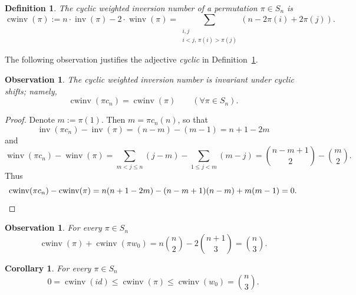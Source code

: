 \documentclass[11pt]{amsart}
\newtheorem{corollary}[theorem]{Corollary}
\newtheorem{observation}[theorem]{Observation}
\newtheorem{defn}[theorem]{Definition}
\numberwithin{equation}{section}
\newcommand{\inv}{{\operatorname{inv}}}
\newcommand{\winv}{{\operatorname{winv}}}
\newcommand{\cwinv}{{\operatorname{cwinv}}}
\begin{document}
\begin{defn}\label{def:cyclic winv}
    The {\em cyclic weighted inversion number} of a permutation $\pi\in S_n$ is
    \[
        \cwinv(\pi)
        := n\cdot \inv(\pi)-2\cdot \winv(\pi)
        = \sum_{\substack{i,j \\ i<j,\, \pi(i)>\pi(j)}} (n-2\pi(i) + 2\pi(j)).
    \]
\end{defn}

The following observation justifies the adjective {\em cyclic} in Definition~\ref{def:cyclic winv}. 

\begin{observation}\label{obs:u3}
The cyclic weighted inversion number is invariant under cyclic shifts; namely, 
\[
    \cwinv(\pi c_n) = \cwinv(\pi) 
    \qquad (\forall \pi\in S_n).
\]
\end{observation}

\begin{proof}
    Denote $m:=\pi(1)$. Then $m = \pi c_n(n)$, so that
    \[
        \inv(\pi c_n)-\inv(\pi)
        = (n-m)-(m-1) = n+1-2m
    \]
    and
    \[
        \winv(\pi c_n)-\winv(\pi)
        = \sum_{m < j \le n} (j-m) -\sum_{1 \le j < m} (m-j)
        = \binom{n-m+1}{2} - \binom{m}{2}.
    \]
    Thus
    \[
        \cwinv(\pi c_n)-\cwinv(\pi)
        = n(n+1-2m)-(n-m+1)(n-m)+m(m-1)
        = 0. \qedhere
    \]
\end{proof}

\begin{observation}\label{obs:u4}
    For every $\pi\in S_n$
    \[
    \cwinv(\pi)+\cwinv(\pi w_0)= n\binom{n}{2}-2\binom{n+1}{3}=\binom{n}{3}.
    \]
\end{observation}

\begin{corollary}\label{obs:u5}
    For every $\pi\in S_n$
    \[
    0=\cwinv(id)\le \cwinv(\pi)\le \cwinv(w_0)=
    \binom{n}{3}.
    \]
\end{corollary}
\end{document}
